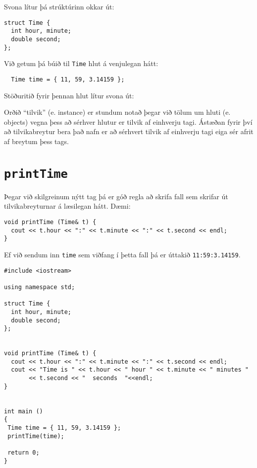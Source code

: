 Svona lítur þá strúktúrinn okkar út: 

\begin{verbatim}
struct Time {
  int hour, minute;
  double second;
};
\end{verbatim}
%
Við getum þá búið til {\tt Time} hlut á venjulegan hátt: 

\begin{verbatim}
  Time time = { 11, 59, 3.14159 };
\end{verbatim}
%
Stöðuritið fyrir þennan hlut lítur svona út:

\vspace{0.1in}
\centerline{}
\vspace{0.1in}

Orðið ``tilvik'' (e. instance) er stundum notað þegar við tölum um hluti (e. objects) vegna þess að sérhver hlutur er tilvik af einhverju tagi.
Ástæðan fyrir því að tilvikabreytur bera það nafn er að sérhvert tilvik af einhverju tagi eiga sér afrit af breytum þess tags.

\section{{\tt printTime}}
\label{printobject}

Þegar við skilgreinum nýtt tag þá er góð regla að skrifa fall sem skrifar út tilvikabreyturnar á læsilegan hátt.
Dæmi:

\begin{verbatim}
void printTime (Time& t) {
  cout << t.hour << ":" << t.minute << ":" << t.second << endl;
}
\end{verbatim}
%
Ef við sendum inn {\tt time} sem viðfang í þetta fall þá er úttakið {\tt 11:59:3.14159}.

\begin{verbatim}
#include <iostream>

using namespace std;

struct Time {
  int hour, minute;
  double second;
};


void printTime (Time& t) {
  cout << t.hour << ":" << t.minute << ":" << t.second << endl;
  cout << "Time is " << t.hour << " hour " << t.minute << " minutes " 
       << t.second << "  seconds  "<<endl;
}


int main ()
{
 Time time = { 11, 59, 3.14159 };
 printTime(time);
 
 return 0;
}
\end{verbatim}
%

